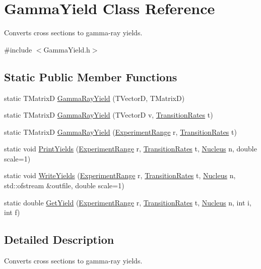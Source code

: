 \hypertarget{classGammaYield}{\section{Gamma\-Yield Class Reference}
\label{classGammaYield}
}


Converts cross sections to gamma-\/ray yields.  




{\ttfamily \#include $<$Gamma\-Yield.\-h$>$}

\subsection*{Static Public Member Functions}
\begin{DoxyCompactItemize}
\item 
static T\-Matrix\-D \hyperlink{classGammaYield_ae2eae4ee7762789e0a70765e09b8383e}{Gamma\-Ray\-Yield} (T\-Vector\-D, T\-Matrix\-D)
\item 
static T\-Matrix\-D \hyperlink{classGammaYield_adbeac7ddd28892dcc254452e6365e851}{Gamma\-Ray\-Yield} (T\-Vector\-D v, \hyperlink{classTransitionRates}{Transition\-Rates} t)
\item 
static T\-Matrix\-D \hyperlink{classGammaYield_a1345958656129277ed4371937903b363}{Gamma\-Ray\-Yield} (\hyperlink{classExperimentRange}{Experiment\-Range} r, \hyperlink{classTransitionRates}{Transition\-Rates} t)
\item 
static void \hyperlink{classGammaYield_aae8b1e302534834dc32f990f2d8e7946}{Print\-Yields} (\hyperlink{classExperimentRange}{Experiment\-Range} r, \hyperlink{classTransitionRates}{Transition\-Rates} t, \hyperlink{classNucleus}{Nucleus} n, double scale=1)
\item 
static void \hyperlink{classGammaYield_aeb91801ba3431b7642f91977aa794791}{Write\-Yields} (\hyperlink{classExperimentRange}{Experiment\-Range} r, \hyperlink{classTransitionRates}{Transition\-Rates} t, \hyperlink{classNucleus}{Nucleus} n, std\-::ofstream \&outfile, double scale=1)
\item 
static double \hyperlink{classGammaYield_a8a83680f6744d15cc4764312cf90a66e}{Get\-Yield} (\hyperlink{classExperimentRange}{Experiment\-Range} r, \hyperlink{classTransitionRates}{Transition\-Rates} t, \hyperlink{classNucleus}{Nucleus} n, int i, int f)
\end{DoxyCompactItemize}


\subsection{Detailed Description}
Converts cross sections to gamma-\/ray yields. 

